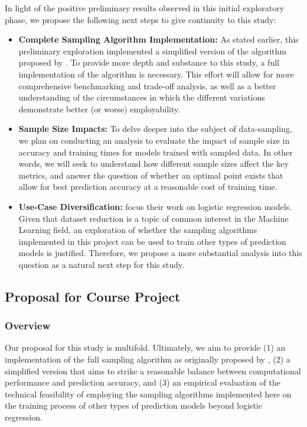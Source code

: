 \documentclass{article}
\theoremstyle{plain}
\theoremstyle{definition}
\theoremstyle{remark}
\begin{document}
In light of the positive preliminary results observed in this initial exploratory phase, we propose the following next steps to give continuity to this study:
\begin{itemize}

 \item \textbf{Complete Sampling Algorithm Implementation:} As stated earlier, this preliminary exploration implemented a simplified version of the algorithm proposed by \citeauthor{chow24}. To provide more depth and substance to this study, a full implementation of the algorithm is necessary. This effort will allow for more comprehensive benchmarking and trade-off analysis, as well as a better understanding of the circumstances in which the different variations demonstrate better (or worse) employability.

\item \textbf{Sample Size Impacts:} To delve deeper into the subject of data-sampling, we plan on conducting an analysis to evaluate the impact of sample size in accuracy and training times for models trained with sampled data. In other words, we will seek to understand how different sample sizes affect the key metrics, and answer the question of whether an optimal point exists that allow for best prediction accuracy at a reasonable cost of training time.

\item \textbf{Use-Case Diversification:} \citeauthor{chow24} focus their work on logistic regression models. Given that dataset reduction is a topic of common interest in the Machine Learning field, an exploration of whether the sampling algorithms implemented in this project can be used to train other types of prediction models is justified. Therefore, we propose a more substantial analysis into this question as a natural next step for this study.

\end{itemize}


\subsection{Proposal for Course Project}

\subsubsection{Overview}

Our proposal for this study is multifold. Ultimately, we aim to provide (1) an implementation of the full sampling algorithm as originally proposed by \citeauthor{chow24}, (2) a simplified version that aims to strike a reasonable balance between computational performance and prediction accuracy, and (3) an empirical evaluation of the technical feasibility of employing the sampling algorithms implemented here on the training process of other types of prediction models beyond logistic regression.
\end{document}
